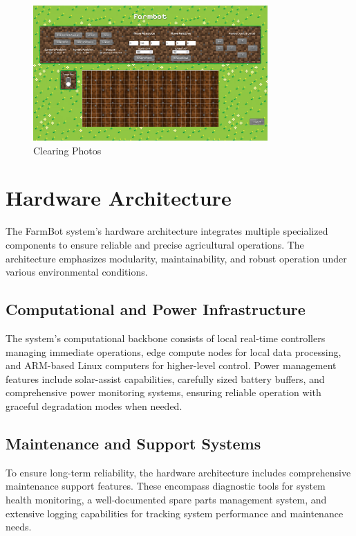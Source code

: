 \begin{figure}[H]
    \centering
    \includegraphics[width=0.8\textwidth]{img/clearing_photos.png}
    \caption{Clearing Photos}
    \label{fig:dashboard_clearing_photos}
\end{figure}

\newpage
\section{Hardware Architecture}

The FarmBot system's hardware architecture integrates multiple specialized components to ensure reliable and precise agricultural operations. The architecture emphasizes modularity, maintainability, and robust operation under various environmental conditions.

\subsection{Computational and Power Infrastructure}
The system's computational backbone consists of local real-time controllers managing immediate operations, edge compute nodes for local data processing, and ARM-based Linux computers for higher-level control. Power management features include solar-assist capabilities, carefully sized battery buffers, and comprehensive power monitoring systems, ensuring reliable operation with graceful degradation modes when needed.

\subsection{Maintenance and Support Systems}
To ensure long-term reliability, the hardware architecture includes comprehensive maintenance support features. These encompass diagnostic tools for system health monitoring, a well-documented spare parts management system, and extensive logging capabilities for tracking system performance and maintenance needs.

